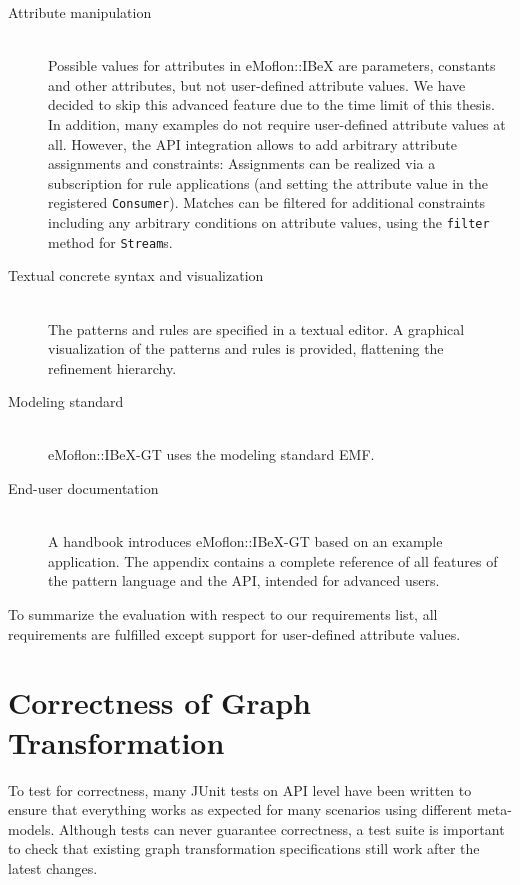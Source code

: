 \begin{description}
	\item[Attribute manipulation] ~\\
		Possible values for attributes in eMoflon::IBeX are parameters, constants and other attributes, but not user-defined attribute values.
		We have decided to skip this advanced feature due to the time limit of this thesis.
		In addition, many examples do not require user-defined attribute values at all.
		However, the API integration allows to add arbitrary attribute assignments and constraints:
		Assignments can be realized via a subscription for rule applications (and setting the attribute value in the registered \texttt{Consumer}).
		Matches can be filtered for additional constraints including any arbitrary conditions on attribute values, \eg using the \texttt{filter} method for \texttt{Stream}s.

	\item[Textual concrete syntax and visualization] ~\\
		The patterns and rules are specified in a textual editor.
		A graphical visualization of the patterns and rules is provided, flattening the refinement hierarchy.

	\item[Modeling standard] ~\\
		eMoflon::IBeX-GT uses the modeling standard EMF.		

	\item[End-user documentation] ~\\
		A handbook \cite{eMoflonIBeX-GT-Handbook} introduces eMoflon::IBeX-GT based on an example application.
		The appendix contains a complete reference of all features of the pattern language and the API, intended for advanced users.
\end{description}

\noindent
To summarize the evaluation with respect to our requirements list, all requirements are fulfilled except support for user-defined attribute values.

\section{Correctness of Graph Transformation}
\label{evaluation-correctness}
To test for correctness, many JUnit tests on API level have been written to ensure that everything works as expected for many scenarios using different meta-models.
Although tests can never guarantee correctness, a test suite is important to check that existing graph transformation specifications still work after the latest changes.


